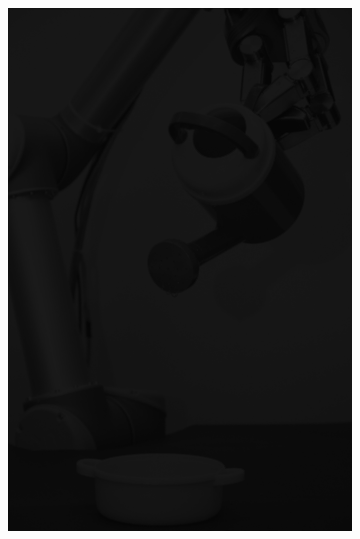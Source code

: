 \begin{figure}[H]
    \centering
    \begin{subfigure}[b]{0.1\textwidth}
        \includegraphics[width=\textwidth]{img3/test/contrast_5_0_1_final_img3.png}
    \end{subfigure}
    \begin{subfigure}[b]{0.1\textwidth}

\end{subfigure}
\end{figure}
